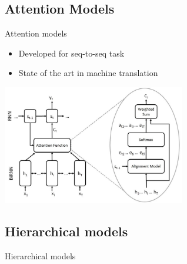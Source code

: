 \subsection{Attention Models}

\begin{frame}{Attention models}
  \begin{itemize}
  \item Developed for seq-to-seq task
  \item State of the art in machine translation
  \end{itemize}
  \begin{center}
    \includegraphics[width=0.6\textwidth]{img/attention.jpg}
  \end{center}  
\end{frame}

\subsection{Hierarchical models}
\begin{frame}{Hierarchical models}
  
\end{frame}

